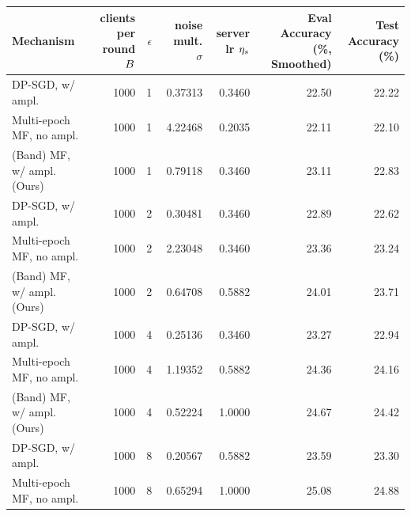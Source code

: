 \begin{tabular}{lrrrrrr}
\toprule
       Mechanism &
       \parbox{1.3cm}{clients per round $B$} &
       $\epsilon$ &
       \parbox{1.3cm}{noise mult. $\sigma$} &
       \parbox{1cm}{server\\ lr $\eta_s$} &
       \parbox{1.9cm}{Eval Accuracy (\%, Smoothed)} &
       \parbox{1.9cm}{Test Accuracy (\%)} \\
\midrule
           DP-SGD, w/ ampl. &           1000 &          1 &          0.37313 &             0.3460 &                             22.50 &             22.22 \\
   Multi-epoch MF, no ampl. &           1000 &          1 &          4.22468 &             0.2035 &                             22.11 &             22.10 \\
 (Band) MF, w/ ampl. (Ours) &           1000 &          1 &          0.79118 &             0.3460 &                             23.11 &             22.83 \\
\midrule
           DP-SGD, w/ ampl. &           1000 &          2 &          0.30481 &             0.3460 &                             22.89 &             22.62 \\
   Multi-epoch MF, no ampl. &           1000 &          2 &          2.23048 &             0.3460 &                             23.36 &             23.24 \\
 (Band) MF, w/ ampl. (Ours) &           1000 &          2 &          0.64708 &             0.5882 &                             24.01 &             23.71 \\
\midrule
           DP-SGD, w/ ampl. &           1000 &          4 &          0.25136 &             0.3460 &                             23.27 &             22.94 \\
   Multi-epoch MF, no ampl. &           1000 &          4 &          1.19352 &             0.5882 &                             24.36 &             24.16 \\
 (Band) MF, w/ ampl. (Ours) &           1000 &          4 &          0.52224 &             1.0000 &                             24.67 &             24.42 \\
\midrule
           DP-SGD, w/ ampl. &           1000 &          8 &          0.20567 &             0.5882 &                             23.59 &             23.30 \\
   Multi-epoch MF, no ampl. &           1000 &          8 &          0.65294 &             1.0000 &                             25.08 &             24.88 \\

\end{tabular}
